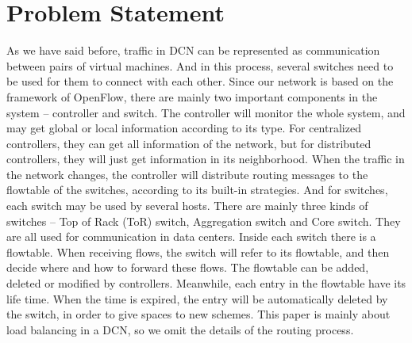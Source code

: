 

\chapter{Problem Statement}
\label{chap:problem}

As we have said before, traffic in DCN can be represented as communication between pairs of virtual machines. And in this process, several switches need to be used for them to connect with each other. Since our network is based on the framework of OpenFlow, there are mainly two important components in the system -- controller and switch. The controller will monitor the whole system, and may get global or local information according to its type. For centralized controllers, they can get all information of the network, but for distributed controllers, they will just get information in its neighborhood. When the traffic in the network changes, the controller will distribute routing messages to the flowtable of the switches, according to its built-in strategies. And for switches, each switch may be used by several hosts. There are mainly three kinds of switches -- Top of Rack (ToR) switch, Aggregation switch and Core switch. They are all used for communication in data centers. Inside each switch there is a flowtable. When receiving flows, the switch will refer to its flowtable, and then decide where and how to forward these flows. The flowtable can be added, deleted or modified by controllers. Meanwhile, each entry in the flowtable have its life time. When the time is expired, the entry will be automatically deleted by the switch, in order to give spaces to new schemes. This paper is mainly about load balancing in a DCN, so we omit the details of the routing process.

